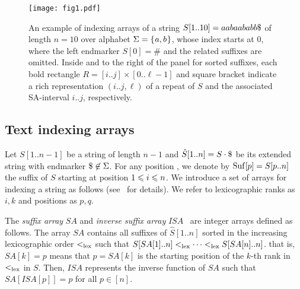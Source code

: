 

\begin{figure}[t]
\centering  
\texttt{[image: fig1.pdf]}
\vspace{.5\baselineskip}
\caption{An example of indexing arrays of a string $S[1..10] = aabaababb\daller$ of length $n = 10$ over alphabet $\Sigma = \set{a, b}$, whose index starts at $0$, where the left endmarker $S[0]=\#$ and the related suffixes are omitted. 
  Inside and to the right of the panel for sorted suffixes, each bold rectangle $R = [i..j]\times [0..\ell-1]$ and square bracket
indicate a rich representation $(i..j, \ell)$ of a repeat of $S$ and 
the associated SA-interval $i..j$, respectively. 
}\label{fig:example:arrays}
\end{figure}

\subsection{Text indexing arrays}
Let $S[1..n-1]$ be a string of length $n-1$ and $\hat S[1..n] = S\cdot \daller$ be its extended string with endmarker $\daller \not\in \Sigma$. For any position , we denote by $\Suf[p] = S[p..n]$ the suffix of $S$ starting at position $\btw i1n$. 
We introduce a set of arrays for indexing a string as follows (see~\cite{navarro2016cds:book} for details).
We refer to lexicographic ranks as $i, k$ and positions as $p, q$.


The \textit{suffix array} $SA$ and \textit{inverse suffix array} $ISA$~\cite{manber:myers1993suffixarrays} are integer arrays defined as follows. 
The array $SA$ contains all suffixes of $\hat S[1..n]$ sorted in the increasing lexicographic order $<_\lex$ such that 
$S[SA[1]..n]<_\lex \dots <_\lex S[SA[n]..n]$. that is, $SA[k] = p$ means that $p = SA[k]$ is the starting position of the $k$-th rank in $<_\lex$ in $S$. 
Then, $ISA$ represents the inverse function of $SA$ such that $SA[ISA[p]] = p$ for all $p \in [n]$.

